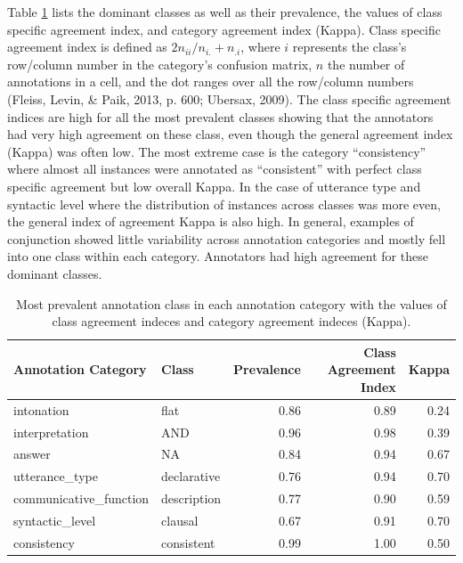 \documentclass[
  english,
  ,man,floatsintext]{apa6}
\begin{document}
Table \ref{tab:andAgreeStats} lists the dominant classes as well as their prevalence, the values of class specific agreement index, and category agreement index (Kappa). Class specific agreement index is defined as \(2n_{ii}/n_{i.}+n_{.i}\), where \(i\) represents the class's row/column number in the category's confusion matrix, \(n\) the number of annotations in a cell, and the dot ranges over all the row/column numbers (Fleiss, Levin, \& Paik, 2013, p. 600; Ubersax, 2009). The class specific agreement indices are high for all the most prevalent classes showing that the annotators had very high agreement on these class, even though the general agreement index (Kappa) was often low. The most extreme case is the category ``consistency'' where almost all instances were annotated as ``consistent'' with perfect class specific agreement but low overall Kappa. In the case of utterance type and syntactic level where the distribution of instances across classes was more even, the general index of agreement Kappa is also high. In general, examples of conjunction showed little variability across annotation categories and mostly fell into one class within each category. Annotators had high agreement for these dominant classes.

\begin{table}

\caption{\label{tab:andAgreeStats}Most prevalent annotation class in each annotation category with the values of class agreement indeces and category agreement indeces (Kappa).}
\centering
\begin{tabular}[t]{l|l|r|r|r}
\hline
Annotation Category & Class & Prevalence & Class Agreement Index & Kappa\\
\hline
intonation & flat & 0.86 & 0.89 & 0.24\\
\hline
interpretation & AND & 0.96 & 0.98 & 0.39\\
\hline
answer & NA & 0.84 & 0.94 & 0.67\\
\hline
utterance\_type & declarative & 0.76 & 0.94 & 0.70\\
\hline
communicative\_function & description & 0.77 & 0.90 & 0.59\\
\hline
syntactic\_level & clausal & 0.67 & 0.91 & 0.70\\
\hline
consistency & consistent & 0.99 & 1.00 & 0.50\\
\hline
\end{tabular}
\end{table}

\setlength{\parindent}{-0.5in}
\setlength{\leftskip}{0.5in}
\end{document}
